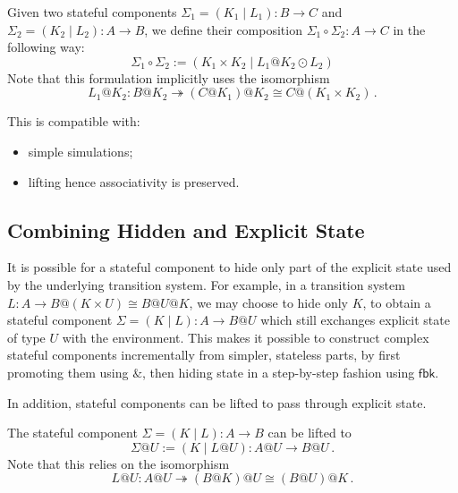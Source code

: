 \documentclass[acmsmall,screen,review,anonymous]{acmart}
\newcommand{\kw}[1]{\ensuremath{ \mathsf{#1} }}
\begin{document}
\begin{definition}[Composition] \label{def:slcomp}
Given two stateful components
$\Sigma_1 = (K_1 \mid L_1) : B \rightarrow C$ and
$\Sigma_2 = (K_2 \mid L_2) : A \rightarrow B$,
we define their composition
$\Sigma_1 \circ \Sigma_2 : A \rightarrow C$
in the following way:
\[
  \Sigma_1 \circ \Sigma_2 :=
    ( K_1 \times K_2 \mid L_1@K_2 \odot L_2 )
\]
Note that this formulation
implicitly uses the isomorphism
\[
  L_1@K_2 : B@K_2 \twoheadrightarrow (C@K_1)@K_2 \cong C@(K_1 \times K_2)
  \,.
\]
\end{definition}




\begin{lemma}
  This is compatible with:
  \begin{itemize}
    \item simple simulations;
    \item lifting hence associativity is preserved.
  \end{itemize}

\end{lemma}


\subsection{Combining Hidden and Explicit State} %

It is possible for a stateful component
to hide only part of the explicit state
used by the underlying transition system.
For example,
in a transition system
$L : A \rightarrow B@(K \times U) \cong B@U@K$,
we may choose to hide only $K$,
to obtain a stateful component
$\Sigma = (K \mid L) : A \rightarrow B@U$
which still exchanges explicit state of type $U$
with the environment.
This makes it possible to construct
complex stateful components incrementally
from simpler, stateless parts,
by first promoting them using $\&$,
then hiding state in a step-by-step fashion
using $\kw{fbk}$.

In addition,
stateful components can be lifted
to pass through explicit state.

\begin{definition} \label{def:slift}
The stateful component $\Sigma = (K \mid L) : A \rightarrow B$
can be lifted to \[ \Sigma@U := (K \mid L@U) : A@U \rightarrow B@U \,. \]
Note that this relies on the isomorphism
\[
  L@U : A@U \twoheadrightarrow (B@K)@U \cong (B@U)@K
  \,.
\]
\end{definition}
\end{document}
